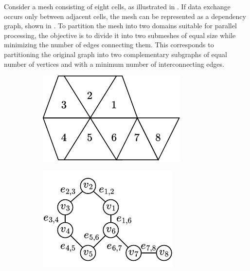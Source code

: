 \documentclass[../paper.tex]{subfiles}
\begin{document}
    Consider a mesh consisting of eight cells, as illustrated in .
    If data exchange occurs only between adjacent cells, the mesh can be represented as a dependency
    graph, shown in .
    To partition the mesh into two domains suitable for parallel processing, the objective
    is to divide it into two submeshes of equal size while
    minimizing the number of edges connecting them.
    This corresponds to partitioning the original graph into two complementary 
    subgraphs of equal number of vertices and with a minimum number of interconnecting edges.
    
    \begin{figure}[h!]
        \centering
        \begin{subfigure}[b]{0.23\textwidth}
            \centering
            \includegraphics[width=\textwidth]{images/mesh.drawio.svg.pdf}
            \caption{}
            \label{fig:mesh_example}
        \end{subfigure}
        \hfill
        \begin{subfigure}[b]{0.23\textwidth}
            \centering
            \includegraphics[width=\textwidth]{images/graph.drawio.svg.pdf}

\end{subfigure}
\end{figure}
\end{document}
